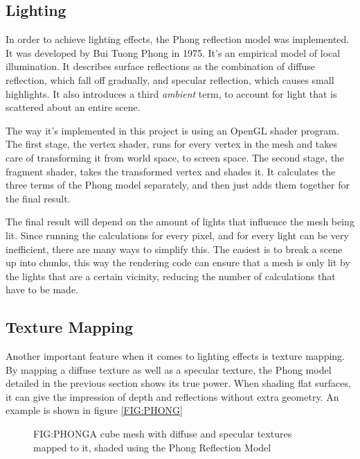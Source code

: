 
\subsection{Lighting}

In order to achieve lighting effects,
the Phong reflection model was implemented.
It was developed by Bui Tuong Phong in 1975\cite{phong}.
It's an empirical model of local illumination.
It describes surface reflections as the combination of diffuse reflection,
which fall off gradually,
and specular reflection,
which causes small highlights.
It also introduces a third \textit{ambient} term,
to account for light that is scattered about an entire scene.

The way it's implemented in this project is using an OpenGL shader program.
The first stage, the vertex shader,
runs for every vertex in the mesh and takes care of transforming it from world space,
to screen space.
The second stage, the fragment shader,
takes the transformed vertex and shades it.
It calculates the three terms of the Phong model separately,
and then just adds them together for the final result.

The final result will depend on the amount of lights that influence the mesh being lit.
Since running the calculations for every pixel,
and for every light can be very inefficient,
there are many ways to simplify this.
The easiest is to break a scene up into chunks,
this way the rendering code can ensure that a mesh is only lit by the lights that are a certain vicinity,
reducing the number of calculations that have to be made.

\subsection{Texture Mapping}

Another important feature when it comes to lighting effects is texture mapping.
By mapping a diffuse texture as well as a specular texture,
the Phong model detailed in the previous section shows its true power.
When shading flat surfaces,
it can give the impression of depth and reflections without extra geometry.
An example is shown in figure \ref{FIG:PHONG}

\begin{figure}[Phong lighting with texture mapping]{FIG:PHONG}{A cube mesh with diffuse and specular textures mapped to it, shaded using the Phong Reflection Model}
\end{figure}
